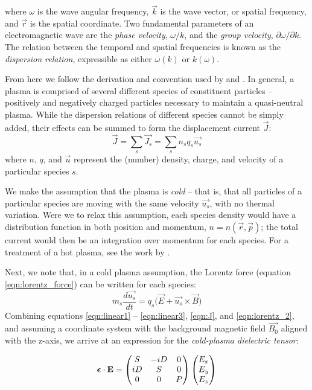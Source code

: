 where $\omega$ is the wave angular frequency, $\vec{k}$ is the wave vector, or spatial frequency, and $\vec{r}$ is the spatial coordinate. Two fundamental parameters of an electromagnetic wave are the \emph{phase velocity}, $\omega/k$, and the \emph{group velocity}, $\partial\omega/\partial k$. The relation between the temporal and spatial frequencies is known as the \emph{dispersion relation}, expressible as either $\omega(k)$ or $k(\omega)$. 

From here we follow the derivation and convention used by \cite{Stix1992} and \cite{Bittencourt2004}. In general, a plasma is comprised of several different species of constituent particles -- positively and negatively charged particles necessary to maintain a quasi-neutral plasma. While the dispersion relations of different species cannot be simply added, their effects can be summed to form the displacement current $\vec{J}$:
\begin{equation}
\vec{J} = \sum_s\vec{J_s} = \sum_s n_s q_s \vec{u_s}
\label{eqn:J}
\end{equation}
where $n$, $q$, and $\vec{u}$ represent the (number) density, charge, and velocity of a particular species $s$. 

We make the assumption that the plasma is \emph{cold} -- that is, that all particles of a particular species are moving with the same velocity $\vec{u_s}$, with no thermal variation.  Were we to relax this assumption, each species density would have a distribution function in both position and momentum, $n=n(\vec{r},\vec{p})$; the total current would then be an integration over momentum for each species. For a treatment of a hot plasma, see the work by \cite{Sazhin1993}.

Next, we note that, in a cold plasma assumption, the Lorentz force (equation \ref{eqn:lorentz_force}) can be written for each species:
\begin{equation}
m_s\frac{d\vec{u_s}}{dt} = q_s\big(\vec{E} + \vec{u_s}\times\vec{B}\big) 
\label{eqn:lorentz_2}
\end{equation}
Combining equations \eqref{eqn:linear1} -- \eqref{eqn:linear3}, \eqref{eqn:J}, and \eqref{eqn:lorentz_2}, and assuming a coordinate system with the background magnetic field $\vec{B_0}$ aligned with the z-axis, we arrive at an expression for the \emph{cold-plasma dielectric tensor}:

\begin{equation}
\boldsymbol{\epsilon}\cdot\mathbf{E}=\begin{pmatrix}
S & -iD & 0 \\
iD & S & 0 \\
0 & 0 & P \end{pmatrix}\begin{pmatrix}E_x \\ E_y \\ E_z\end{pmatrix}
\end{equation}

